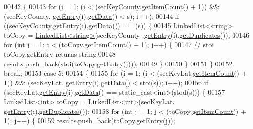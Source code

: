 \begin{DoxyCode}
00142     \{
00143         \textcolor{keywordflow}{for} (i = 1; (i < (secKeyCounty.\hyperlink{classLinkedList_afc6635f854f48f2f126cf3b60d845220}{getItemCount}() + 1)) && (secKeyCounty.
      \hyperlink{classLinkedList_a341bfd7772c9d24d29eb7a7f3936915b}{getEntry}(i).\hyperlink{classSecKeySS_a9fdb8a771250b7aaab556f019b381eab}{getData}() < s); i++);
00144         \textcolor{keywordflow}{if} ((secKeyCounty.\hyperlink{classLinkedList_a341bfd7772c9d24d29eb7a7f3936915b}{getEntry}(i).\hyperlink{classSecKeySS_a9fdb8a771250b7aaab556f019b381eab}{getData}()) == (s)) \{
00145             \hyperlink{classLinkedList}{LinkedList<string>} toCopy = \hyperlink{classLinkedList}{LinkedList<string>}(secKeyCounty
      .\hyperlink{classLinkedList_a341bfd7772c9d24d29eb7a7f3936915b}{getEntry}(i).\hyperlink{classSecKeySS_abef7c9c03e9bc6b818d599966428fdec}{getDuplicates}());
00146             \textcolor{keywordflow}{for} (\textcolor{keywordtype}{int} j = 1; j < (toCopy.\hyperlink{classLinkedList_afc6635f854f48f2f126cf3b60d845220}{getItemCount}() + 1); j++) \{
00147                 \textcolor{comment}{// stoi toCopy.getEntry returns string}
00148                 results.push\_back(stoi(toCopy.\hyperlink{classLinkedList_a341bfd7772c9d24d29eb7a7f3936915b}{getEntry}(j)));
00149             \}
00150         \}
00151     \}
00152     \textcolor{keywordflow}{break};
00153     \textcolor{keywordflow}{case} 5:
00154     \{
00155         \textcolor{keywordflow}{for} (i = 1; (i < (secKeyLat.\hyperlink{classLinkedList_afc6635f854f48f2f126cf3b60d845220}{getItemCount}() + 1)) && (secKeyLat.
      \hyperlink{classLinkedList_a341bfd7772c9d24d29eb7a7f3936915b}{getEntry}(i).\hyperlink{classSecKeySS_a9fdb8a771250b7aaab556f019b381eab}{getData}() < stoi(s)); i++);
00156         \textcolor{keywordflow}{if} (secKeyLat.\hyperlink{classLinkedList_a341bfd7772c9d24d29eb7a7f3936915b}{getEntry}(i).\hyperlink{classSecKeySS_a9fdb8a771250b7aaab556f019b381eab}{getData}() == \textcolor{keyword}{static\_cast<}\textcolor{keywordtype}{int}\textcolor{keyword}{>}(stod(s))) \{
00157             \hyperlink{classLinkedList}{LinkedList<int>} toCopy = \hyperlink{classLinkedList}{LinkedList<int>}(secKeyLat.
      \hyperlink{classLinkedList_a341bfd7772c9d24d29eb7a7f3936915b}{getEntry}(i).\hyperlink{classSecKeySS_abef7c9c03e9bc6b818d599966428fdec}{getDuplicates}());
00158             \textcolor{keywordflow}{for} (\textcolor{keywordtype}{int} j = 1; j < (toCopy.\hyperlink{classLinkedList_afc6635f854f48f2f126cf3b60d845220}{getItemCount}() + 1); j++) \{
00159                 results.push\_back(toCopy.\hyperlink{classLinkedList_a341bfd7772c9d24d29eb7a7f3936915b}{getEntry}(j));

\end{DoxyCode}
